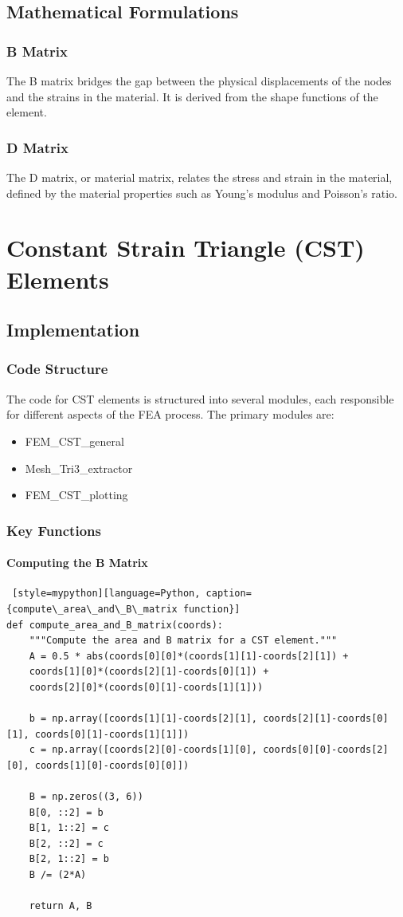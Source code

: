 \documentclass[12pt]{report}
\begin{document}
	\section{Mathematical Formulations}
	\subsection{B Matrix}
	The B matrix bridges the gap between the physical displacements of the nodes and the strains in the material. It is derived from the shape functions of the element.
	
	\subsection{D Matrix}
	The D matrix, or material matrix, relates the stress and strain in the material, defined by the material properties such as Young's modulus and Poisson's ratio.
	
	\chapter{Constant Strain Triangle (CST) Elements}
	\section{Implementation}
	\subsection{Code Structure}
	The code for CST elements is structured into several modules, each responsible for different aspects of the FEA process. The primary modules are:
	\begin{itemize}
		\item FEM\_CST\_general
		\item Mesh\_Tri3\_extractor
		\item FEM\_CST\_plotting
	\end{itemize}
	
	\subsection{Key Functions}
	\subsubsection{Computing the B Matrix}
	\begin{lstlisting} [style=mypython][language=Python, caption={compute\_area\_and\_B\_matrix function}]
def compute_area_and_B_matrix(coords):
	"""Compute the area and B matrix for a CST element."""
	A = 0.5 * abs(coords[0][0]*(coords[1][1]-coords[2][1]) +
	coords[1][0]*(coords[2][1]-coords[0][1]) +
	coords[2][0]*(coords[0][1]-coords[1][1]))
	
	b = np.array([coords[1][1]-coords[2][1], coords[2][1]-coords[0][1], coords[0][1]-coords[1][1]])
	c = np.array([coords[2][0]-coords[1][0], coords[0][0]-coords[2][0], coords[1][0]-coords[0][0]])
	
	B = np.zeros((3, 6))
	B[0, ::2] = b
	B[1, 1::2] = c
	B[2, ::2] = c
	B[2, 1::2] = b
	B /= (2*A)
	
	return A, B
	\end{lstlisting}
	
\end{document}
